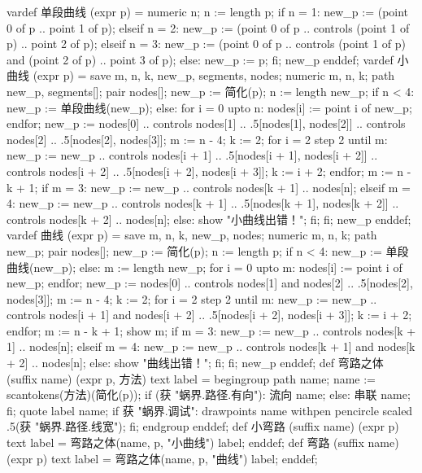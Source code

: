 \startMPinclusions[+]
vardef 单段曲线 (expr p) =
  numeric n; n := length p;
  if n = 1:
    new_p := (point 0 of p .. point 1 of p);
  elseif n = 2:
    new_p := (point 0 of p .. controls (point 1 of p) .. point 2 of p);
  elseif n = 3:
    new_p := (point 0 of p .. 
        controls (point 1 of p) and (point 2 of p) 
        .. point 3 of p);
  else:
    new_p := p;
  fi;
  new_p
enddef;
vardef 小曲线 (expr p) =
  save m, n, k, new_p, segments, nodes;
  numeric m, n, k; path new_p, segments[]; pair nodes[];
  new_p := 简化(p);
  n := length new_p;
  if n < 4:
    new_p := 单段曲线(new_p);
  else:
    for i = 0 upto n:
      nodes[i] := point i of new_p;
    endfor;
    new_p := nodes[0] 
          .. controls nodes[1]
          .. .5[nodes[1], nodes[2]]
          .. controls nodes[2]
          .. .5[nodes[2], nodes[3]];
    m := n - 4;
    k := 2;
    for i = 2 step 2 until m:
      new_p := new_p
          .. controls nodes[i + 1]
          .. .5[nodes[i + 1], nodes[i + 2]]
          .. controls nodes[i + 2]
          .. .5[nodes[i + 2], nodes[i + 3]];
      k := i + 2;
    endfor;
    m := n - k + 1;
    if m = 3:
      new_p := new_p .. controls nodes[k + 1] .. nodes[n];
    elseif m = 4:
      new_p := new_p 
        .. controls nodes[k + 1]
        .. .5[nodes[k + 1], nodes[k + 2]]
        .. controls nodes[k + 2]
        .. nodes[n];
    else:
      show "小曲线出错！";
    fi;
  fi;
  new_p
enddef;
vardef 曲线 (expr p) =
  save m, n, k, new_p, nodes;
  numeric m, n, k; path new_p; pair nodes[];
  new_p := 简化(p);
  n := length p;
  if n < 4:
    new_p := 单段曲线(new_p);
  else:
    m := length new_p;
    for i = 0 upto m:
      nodes[i] := point i of new_p;
    endfor;
    new_p := nodes[0] 
      .. controls nodes[1] and nodes[2] 
      .. .5[nodes[2], nodes[3]];
    m := n - 4;
    k := 2;
    for i = 2 step 2 until m:
      new_p := new_p 
        .. controls nodes[i + 1] and nodes[i + 2] 
        .. .5[nodes[i + 2], nodes[i + 3]];
      k := i + 2;
    endfor;
    m := n - k + 1;
    show m;
    if m = 3:
      new_p := new_p .. controls nodes[k + 1] .. nodes[n];
    elseif m = 4:
      new_p := new_p 
        .. controls nodes[k + 1] and nodes[k + 2]
        .. nodes[n];
    else:
      show "曲线出错！";
    fi;
  fi;
  new_p
enddef;
def 弯路之体 (suffix name) (expr p, 方法) text label =
  begingroup
  path name; name := scantokens(方法)(简化(p));
  if (获 "蜗界.路径.有向"):
    流向 name;
  else:
    串联 name;
  fi;
  quote label name;
  if 获 "蜗界.调试": 
    drawpoints name 
      withpen pencircle scaled .5(获 "蜗界.路径.线宽"); 
  fi;
  endgroup
enddef;
def 小弯路 (suffix name) (expr p) text label =
  弯路之体(name, p, "小曲线") label;
enddef;
def 弯路 (suffix name) (expr p) text label =
  弯路之体(name, p, "曲线") label;
enddef;
\stopMPinclusions

